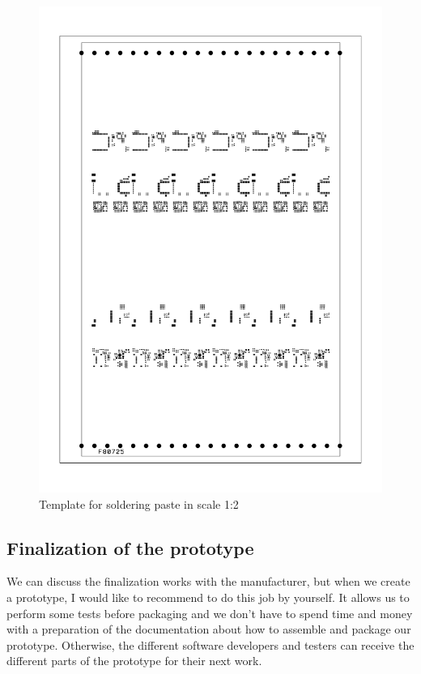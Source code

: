 \begin{figure}
	\centering
	\label{smtPasteTemplate}
	\caption{Template for soldering paste in scale 1:2}
	\includegraphics[angle=90, scale=0.5]{img/smtPasteTemplate.pdf}
\end{figure}

\subsection{Finalization of the prototype}
We can discuss the finalization works with the manufacturer, but when we create a prototype, I would like to recommend to do this job by yourself. It allows us to perform some tests before packaging and we don't have to spend time and money with a preparation of the documentation about how to assemble and package our prototype. Otherwise, the different software developers and testers can receive the different parts of the prototype for their next work.

